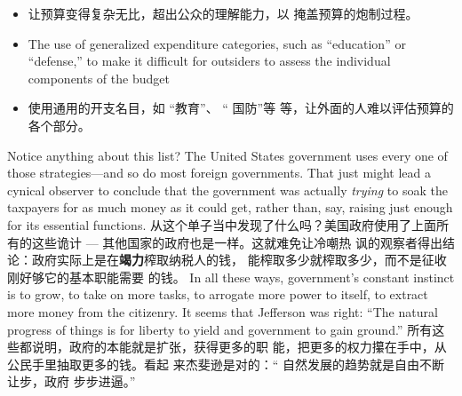 \begin{paracol}{2}
\begin{itemize}
	\item 让预算变得复杂无比，超出公众的理解能力，以
	掩盖预算的炮制过程。
\end{itemize}
\switchcolumn*
\begin{itemize}
	\item The use of generalized expenditure categories, such as ``education'' or ``defense,'' to make it difficult for outsiders to
	assess the individual components of the budget
\end{itemize}
\switchcolumn
\begin{itemize}
	\item 使用通用的开支名目，如 “教育”、 “ 国防”等
	等，让外面的人难以评估预算的各个部分。
\end{itemize}
\switchcolumn*
Notice anything about this list? The United States government uses every one of those strategies---and so do most foreign
governments. That just might lead a cynical observer to conclude that the government was actually \textit{trying} to soak the taxpayers for as much money as it could get, rather than, say,
raising just enough for its essential functions.
\switchcolumn
从这个单子当中发现了什么吗？美国政府使用了上面所有的这些诡计 --- 其他国家的政府也是一样。这就难免让冷嘲热
讽的观察者得出结论：政府实际上是在\textbf{竭力}榨取纳税人的钱，
能榨取多少就榨取多少，而不是征收刚好够它的基本职能需要
的钱。
\switchcolumn*
In all these ways, government's constant instinct is to grow,
to take on more tasks, to arrogate more power to itself, to extract more money from the citizenry. It seems that Jefferson was
right: ``The natural progress of things is for liberty to yield and
government to gain ground.''
\switchcolumn
所有这些都说明，政府的本能就是扩张，获得更多的职
能，把更多的权力攥在手中，从公民手里抽取更多的钱。看起
来杰斐逊是对的：“ 自然发展的趋势就是自由不断让步，政府
步步进逼。”


\end{paracol}
